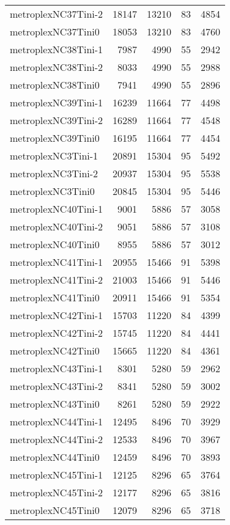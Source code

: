 \begin{longtable}{lrrrr}
metroplexNC37Tini-2 & 18147 & 13210 & 83 & 4854 \\
metroplexNC37Tini0 & 18053 & 13210 & 83 & 4760 \\
metroplexNC38Tini-1 & 7987 & 4990 & 55 & 2942 \\
metroplexNC38Tini-2 & 8033 & 4990 & 55 & 2988 \\
metroplexNC38Tini0 & 7941 & 4990 & 55 & 2896 \\
metroplexNC39Tini-1 & 16239 & 11664 & 77 & 4498 \\
metroplexNC39Tini-2 & 16289 & 11664 & 77 & 4548 \\
metroplexNC39Tini0 & 16195 & 11664 & 77 & 4454 \\
metroplexNC3Tini-1 & 20891 & 15304 & 95 & 5492 \\
metroplexNC3Tini-2 & 20937 & 15304 & 95 & 5538 \\
metroplexNC3Tini0 & 20845 & 15304 & 95 & 5446 \\
metroplexNC40Tini-1 & 9001 & 5886 & 57 & 3058 \\
metroplexNC40Tini-2 & 9051 & 5886 & 57 & 3108 \\
metroplexNC40Tini0 & 8955 & 5886 & 57 & 3012 \\
metroplexNC41Tini-1 & 20955 & 15466 & 91 & 5398 \\
metroplexNC41Tini-2 & 21003 & 15466 & 91 & 5446 \\
metroplexNC41Tini0 & 20911 & 15466 & 91 & 5354 \\
metroplexNC42Tini-1 & 15703 & 11220 & 84 & 4399 \\
metroplexNC42Tini-2 & 15745 & 11220 & 84 & 4441 \\
metroplexNC42Tini0 & 15665 & 11220 & 84 & 4361 \\
metroplexNC43Tini-1 & 8301 & 5280 & 59 & 2962 \\
metroplexNC43Tini-2 & 8341 & 5280 & 59 & 3002 \\
metroplexNC43Tini0 & 8261 & 5280 & 59 & 2922 \\
metroplexNC44Tini-1 & 12495 & 8496 & 70 & 3929 \\
metroplexNC44Tini-2 & 12533 & 8496 & 70 & 3967 \\
metroplexNC44Tini0 & 12459 & 8496 & 70 & 3893 \\
metroplexNC45Tini-1 & 12125 & 8296 & 65 & 3764 \\
metroplexNC45Tini-2 & 12177 & 8296 & 65 & 3816 \\
metroplexNC45Tini0 & 12079 & 8296 & 65 & 3718 \\

\end{longtable}
